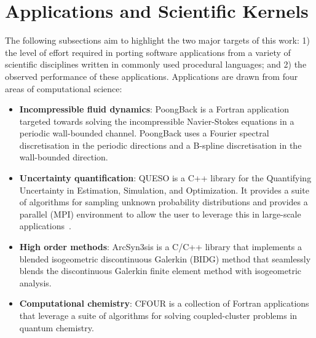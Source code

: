 \section{Applications and Scientific Kernels}
\label{sec:apps}

The following subsections aim to highlight the two major targets of this work: 1) the level of effort
required in porting software applications from a variety of scientific
disciplines written in commonly used procedural languages; and 2) the observed
performance of these applications.  Applications are drawn from four areas
of computational science:
\begin{itemize}
\item {\bf Incompressible fluid dynamics}:  PoongBack is a Fortran application
targeted towards solving the incompressible Navier-Stokes equations in a
periodic wall-bounded channel.  PoongBack uses a Fourier spectral
discretisation in the periodic directions and a B-spline discretisation in the
wall-bounded direction.

\item {\bf Uncertainty quantification}:  QUESO is a C++ library for the
Quantifying Uncertainty in Estimation, Simulation, and Optimization.  It
provides a suite of algorithms for sampling unknown probability distributions
and provides a parallel (MPI) environment to allow the user to leverage this in
large-scale applications~\cite{Prudencio:2012ft,McDougall:2015bc,EstacioHiroms:2016wd}.

\item {\bf High order methods}:  ArcSyn3sis is a C/C++ library that implements
a blended isogeometric discontinuous Galerkin (BIDG) method that seamlessly
blends the discontinuous Galerkin finite element method with isogeometric analysis.

\item {\bf Computational chemistry}:  CFOUR is a collection of Fortran
applications that leverage a suite of algorithms for solving coupled-cluster
problems in quantum chemistry.

\end{itemize}

%
